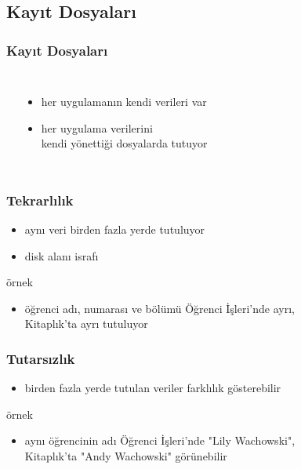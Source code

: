 \documentclass[dvipsnames]{beamer}
\theoremstyle{plain}
\begin{document}
\subsection{Kayıt Dosyaları}

\begin{frame}
  \frametitle{Kayıt Dosyaları}

  \begin{columns}[b]
    \begin{center}
    \end{center}

    \begin{itemize}
      \item her uygulamanın kendi verileri var
      \item her uygulama verilerini\\
	kendi yönettiği dosyalarda tutuyor
    \end{itemize}
  \end{columns}
\end{frame}


\begin{frame}
  \frametitle{Tekrarlılık}

  \begin{itemize}
    \item aynı veri birden fazla yerde tutuluyor
    \item disk alanı israfı
  \end{itemize}

 \medskip
  \begin{exampleblock}{örnek}
    \begin{itemize}
      \item öğrenci adı, numarası ve bölümü Öğrenci İşleri'nde ayrı,\\
	Kitaplık'ta ayrı tutuluyor
    \end{itemize}
  \end{exampleblock}
\end{frame}

\begin{frame}
  \frametitle{Tutarsızlık}

  \begin{itemize}
    \item birden fazla yerde tutulan veriler farklılık gösterebilir
  \end{itemize}

  \medskip
 \begin{exampleblock}{örnek}
    \begin{itemize}
      \item aynı öğrencinin adı Öğrenci İşleri'nde "Lily Wachowski",\\
        Kitaplık'ta "Andy Wachowski" görünebilir
    \end{itemize}
  \end{exampleblock}
\end{frame}
\end{document}
